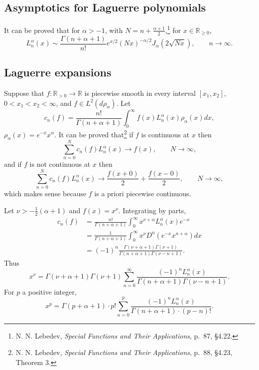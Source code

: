 \documentclass{article}
\theoremstyle{definition}
\begin{document}
\subsection{Asymptotics for Laguerre polynomials}
It can be proved that for $\alpha>-1$, with $N=n+\frac{\alpha+1}{2}$,\footnote{N. N. Lebedev,
{\em Special Functions and Their Applications}, p.~87, \S 4.22.} for $x \in \mathbb{R}_{\geq 0}$,
\[
L_n^\alpha(x) \sim \frac{\Gamma(n+\alpha+1)}{n!} e^{x/2} (Nx)^{-\alpha/2} J_\alpha(2\sqrt{Nx}),
\qquad n \to \infty.
\]


\subsection{Laguerre expansions}
Suppose that $f:\mathbb{R}_{>0} \to \mathbb{R}$ is piecewise smooth in every interval
$[x_1,x_2]$, $0<x_1<x_2<\infty$, and 
$f \in L^2(d\rho_\alpha)$. 
Let 
\[
c_n(f) = \frac{n!}{\Gamma(n+\alpha+1)} \int_0^\infty f(x) L_n^\alpha(x) \rho_\alpha(x) dx,
\]
$\rho_\alpha(x)=e^{-x} x^\alpha$.
It can be proved that\footnote{N. N. Lebedev,
{\em Special Functions and Their Applications}, p.~88, \S 4.23, Theorem 3.}
if $f$ is continuous at $x$ then
\[
\sum_{n=0}^N c_n(f) L_n^\alpha(x) \to f(x),\qquad N \to \infty,
\]
and if $f$ is not continuous at $x$ then
\[
\sum_{n=0}^N c_n(f) L_n^\alpha(x) \to \frac{f(x+0)}{2}+\frac{f(x-0)}{2},\qquad N \to \infty,
\]
which makes sense because $f$ is a priori piecewise continuous.



Let $\nu>-\frac{1}{2}(\alpha+1)$ and $f(x)=x^\nu$. 
Integrating by parts,
\begin{align*}
c_n(f)&=\frac{n!}{\Gamma(n+\alpha+1)} \int_0^\infty x^{\nu+\alpha} L_n^\alpha(x) e^{-x} \\
&=\frac{1}{\Gamma(n+\alpha+1)} \int_0^\infty x^\nu D^n(e^{-x}x^{n+\alpha}) dx\\
&=(-1)^n \frac{\Gamma(\nu+\alpha+1)\Gamma(\nu+1)}{\Gamma(n+\alpha+1)\Gamma(\nu-n+1)}.
\end{align*}
Thus
\[
x^\nu = \Gamma(\nu+\alpha+1)\Gamma(\nu+1) \sum_{n=0}^\infty \frac{(-1)^n L_n^\alpha(x)}{\Gamma(n+\alpha+1)
\Gamma(\nu-n+1)}.
\]
For $p$ a positive integer,
\[
x^p = \Gamma(p+\alpha+1) \cdot p! \sum_{n=0}^p \frac{(-1)^n L_n^\alpha(x)}{\Gamma(n+\alpha+1) \cdot (p-n)!}.
\]
\end{document}
